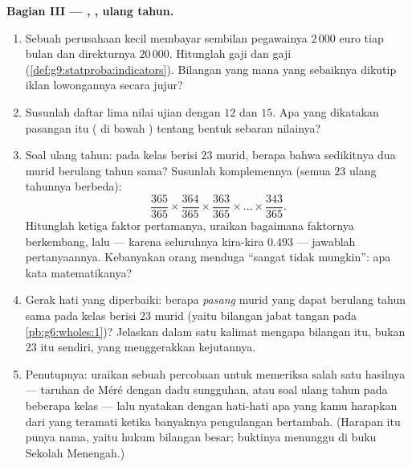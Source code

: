\begin{problem}
\medskip
\noindent\textbf{Bagian III --- , , ulang tahun.}
\begin{enumerate}[resume]
  \item Sebuah perusahaan kecil membayar sembilan pegawainya
        $2\,000$ euro tiap bulan dan direkturnya $20\,000$. Hitunglah
        gaji  dan gaji 
        (\cref{def:g9:statproba:indicators}). Bilangan yang mana yang
        sebaiknya dikutip iklan lowongannya secara jujur?
  \item Susunlah daftar lima nilai ujian dengan  $12$ dan
         $15$. Apa yang dikatakan pasangan itu ( di
        bawah ) tentang bentuk sebaran nilainya?
  \item Soal ulang tahun: pada kelas berisi $23$ murid, berapa
         bahwa sedikitnya dua murid berulang tahun sama?
        Susunlah komplemennya (semua $23$ ulang tahunnya berbeda):
        \[
        \frac{365}{365} \times \frac{364}{365} \times
        \frac{363}{365} \times \dots \times \frac{343}{365} .
        \]
        Hitunglah  ketiga faktor pertamanya, uraikan
        bagaimana faktornya berkembang, lalu --- karena 
        seluruhnya kira-kira $0.493$ --- jawablah pertanyaannya.
        Kebanyakan orang menduga ``sangat tidak mungkin'': apa kata
        matematikanya?
  \item Gerak hati yang diperbaiki: berapa \emph{pasang} murid yang
        dapat berulang tahun sama pada kelas berisi $23$ murid
        (yaitu bilangan jabat tangan pada \cref{pb:g6:wholes:1})?
        Jelaskan dalam satu kalimat mengapa bilangan itu, bukan $23$
        itu sendiri, yang menggerakkan kejutannya.
  \item Penutupnya: uraikan sebuah percobaan untuk memeriksa salah
        satu hasilnya --- taruhan de Méré dengan dadu sungguhan, atau
        soal ulang tahun pada beberapa kelas --- lalu nyatakan dengan
        hati-hati apa yang kamu harapkan dari  yang
        teramati ketika banyaknya pengulangan bertambah. (Harapan itu
        punya nama, yaitu hukum bilangan besar; buktinya menunggu di
        buku Sekolah Menengah.)

\end{enumerate}
\end{problem}
